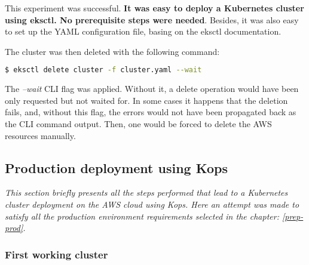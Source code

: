 This experiment was successful. \textbf{It was easy to deploy a Kubernetes cluster using eksctl. No prerequisite steps were needed}. Besides, it was also easy to set up the YAML configuration file, basing on the eksctl documentation\cite{eksctl-creating-clusters}.


The cluster was then deleted with the following command:
\begin{lstlisting}[basicstyle=\small,caption={Command used to delete Kubernetes cluster with eksctl},captionpos=b,language=Bash,xleftmargin=1cm]
$ eksctl delete cluster -f cluster.yaml --wait
\end{lstlisting}
The \textit{--wait} CLI flag was applied. Without it, a delete operation would have been only requested but not waited for. In some cases it happens that the deletion fails, and, without this flag, the errors would not have been propagated back as the CLI command output. Then, one would be forced to delete the AWS resources manually\cite{eksctl-creating-clusters}.

\subsection{Production deployment using Kops}
\textit{This section briefly presents all the steps performed that lead to a Kubernetes cluster deployment on the AWS cloud using Kops. Here an attempt was made to satisfy all the production environment requirements selected in the chapter: \ref{prep-prod}.}
\\

\subsubsection{First working cluster}

